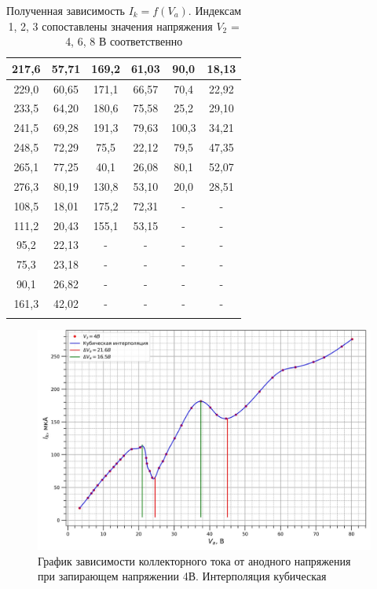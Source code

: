 \documentclass[a4paper, 12pt]{article}%
\begin{document}
\begin{enumerate}
\begin{longtable}{|c|c|c|c|c|c|}
	217,6 & 57,71 & 169,2 & 61,03 & 90,0 & 18,13 \\ \hline
	229,0 & 60,65 & 171,1 & 66,57 & 70,4 & 22,92 \\ \hline
	233,5 & 64,20 & 180,6 & 75,58 & 25,2 & 29,10 \\ \hline
	241,5 & 69,28 & 191,3 & 79,63 & 100,3 & 34,21 \\ \hline
	248,5 & 72,29 & 75,5 & 22,12 & 79,5 & 47,35 \\ \hline
	265,1 & 77,25 & 40,1 & 26,08 & 80,1 & 52,07 \\ \hline
	276,3 & 80,19 & 130,8 & 53,10 & 20,0 & 28,51 \\ \hline
	  
	108,5 & 18,01 & 175,2 & 72,31 & - & - \\ \hline
	111,2 & 20,43 & 155,1 & 53,15 & - & - \\ \hline
	95,2 & 22,13 & - & - & - & - \\ \hline
	75,3 & 23,18 & - & - & - & - \\ \hline
	90,1 & 26,82 & - & - & - & - \\ \hline
	161,3 & 42,02 & - & - & - & - \\ \hline
	
	\caption{Полученная зависимость $I_k = f(V_a)$. Индексам 1, 2, 3 сопоставлены значения напряжения $V_2$ = 4, 6, 8 В соответственно}
\end{longtable} 

\newpage

	\begin{figure}[H]
		\centering
		\includegraphics[width=1\linewidth]{4v}
		\caption{График зависимости коллекторного тока от анодного напряжения при запирающем напряжении 4В. Интерполяция кубическая}
	\end{figure}


\end{enumerate}
\end{document}
